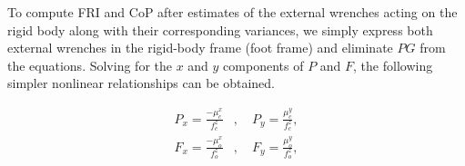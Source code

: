 \documentclass[letterpaper, 10 pt, conference]{ieeeconf}  %
\begin{document}
To compute FRI and CoP after estimates of the external wrenches acting on the rigid body along with their corresponding variances, we simply express both external wrenches in the rigid-body frame (foot frame) and eliminate $PG$ from the equations. Solving for the $x$ and $y$ components of $P$ and $F$, the following simpler nonlinear relationships can be obtained. 

  \begin{equation}
  \begin{split}
  P_x = \frac{-\mu_c^x}{f_c^z} &, \quad P_y = \frac{\mu_c^y}{f_c^z}, \\
  F_x = \frac{-\mu_o^x}{f_o^z} &, \quad F_y = \frac{\mu_o^y}{f_o^z},
  \end{split}
\end{equation}




\end{document}
